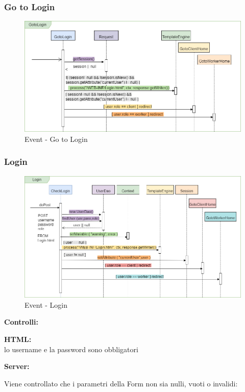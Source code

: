 \documentclass[a4paper, 12pt]{article}
\begin{document}
\subsubsection{Go to Login}
\begin{figure}[h!]
	\centering
	\includegraphics[width=1\textwidth]{PureHTML_images/GotoLogin.png}
	\caption{Event - Go to Login}
	\label{figure:gotologin_sd}
\end{figure}
\subsubsection{Login}
\begin{figure}[h!]
	\centering
	\includegraphics[width=1\textwidth]{PureHTML_images/Login.png}
	\caption{Event - Login}
	\label{figure:login_sd}
\end{figure}
\noindent \textbf{Controlli:}

\noindent \textbf{HTML:} \\ lo username e la password sono obbligatori

\noindent \textbf{Server:} 

\noindent Viene controllato che i parametri della Form non sia nulli, vuoti o invalidi:
\end{document}

